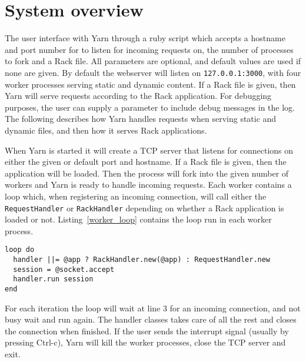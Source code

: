 \section{System overview}

The user interface with Yarn through a ruby script which accepts a
hostname and port number for to listen for incoming requests on, the number
of processes to fork and a Rack file. All parameters are optional, and default
values are used if none are given. By default the webserver will listen on
\texttt{127.0.0.1:3000}, with four worker processes serving static and dynamic
content. If a Rack file is given, then Yarn will serve requests according to
the Rack application. For debugging purposes, the user can supply a parameter
to include debug messages in the log. The following describes how Yarn handles
requests when serving static and dynamic files, and then how it serves Rack
applications.

When Yarn is started it will create a TCP server that listens for connections
on either the given or default port and hostname. If a Rack file is given,
then the application will be loaded. Then the process will fork into the given
number of workers and Yarn is ready to handle incoming requests. Each worker
contains a loop which, when registering an incoming connection, will call
either the \texttt{RequestHandler} or \texttt{RackHandler} depending on
whether a Rack application is loaded or not. Listing~\ref{worker_loop}
contains the loop run in each worker process.

\bigskip
\begin{lstlisting}[label=worker_loop,caption=Worker loop
(lib/yarn/server.rb:53)]
loop do
  handler ||= @app ? RackHandler.new(@app) : RequestHandler.new
  session = @socket.accept
  handler.run session 
end
\end{lstlisting}

For each iteration the loop will wait at line 3 for an incoming connection,
and not busy wait and run again. The handler classes takes care of all the
rest and closes the connection when finished. If the user sends
the interrupt signal (usually by pressing Ctrl-c), Yarn will kill the worker
processes, close the TCP server and exit.
